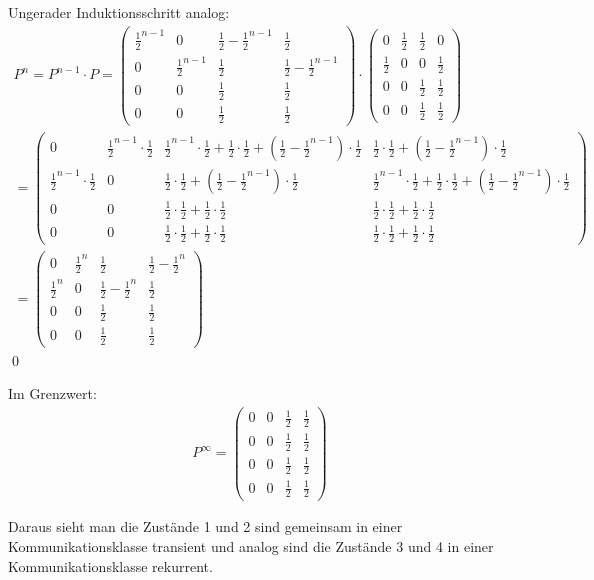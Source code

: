 \documentclass[a4paper,11pt,notitlepage,fullpage]{article}
\begin{document}
\begin{enumerate}
\begin{enumerate}
Ungerader Induktionsschritt analog:
\begin{gather*}
P^n = P^{n-1} \cdot P = \begin{pmatrix}
\frac{1}{2}^{n-1}&0&\frac{1}{2}-\frac{1}{2}^{n-1}&\frac{1}{2} \\
0&\frac{1}{2}^{n-1}&\frac{1}{2}&\frac{1}{2}-\frac{1}{2}^{n-1} \\
0&0&\frac{1}{2}&\frac{1}{2}\\
0&0&\frac{1}{2}&\frac{1}{2}
\end{pmatrix} \cdot \begin{pmatrix}
0&\frac{1}{2}&\frac{1}{2}&0 \\
\frac{1}{2}&0&0&\frac{1}{2} \\
0&0&\frac{1}{2}&\frac{1}{2}\\
0&0&\frac{1}{2}&\frac{1}{2}
\end{pmatrix} \\
= \begin{pmatrix}
0 & \frac{1}{2}^{n-1} \cdot \frac{1}{2} & \frac{1}{2}^{n-1} \cdot \frac{1}{2} + \frac{1}{2}\cdot\frac{1}{2} +  (\frac{1}{2} - \frac{1}{2}^{n-1})\cdot\frac{1}{2} & \frac{1}{2}\cdot\frac{1}{2} + (\frac{1}{2} - \frac{1}{2}^{n-1})\cdot\frac{1}{2} \\
\frac{1}{2}^{n-1} \cdot \frac{1}{2} & 0 & \frac{1}{2}\cdot\frac{1}{2} + (\frac{1}{2} - \frac{1}{2}^{n-1})\cdot\frac{1}{2} & \frac{1}{2}^{n-1} \cdot \frac{1}{2} + \frac{1}{2}\cdot\frac{1}{2} +  (\frac{1}{2} - \frac{1}{2}^{n-1})\cdot\frac{1}{2}\\
0&0&\frac{1}{2}\cdot\frac{1}{2} + \frac{1}{2}\cdot\frac{1}{2}&\frac{1}{2}\cdot\frac{1}{2} + \frac{1}{2}\cdot\frac{1}{2}\\
0&0&\frac{1}{2}\cdot\frac{1}{2} + \frac{1}{2}\cdot\frac{1}{2}&\frac{1}{2}\cdot\frac{1}{2} + \frac{1}{2}\cdot\frac{1}{2}
\end{pmatrix} \\
= \begin{pmatrix}
0&\frac{1}{2}^n&\frac{1}{2}&\frac{1}{2}-\frac{1}{2}^n \\
\frac{1}{2}^n&0&\frac{1}{2}-\frac{1}{2}^n&\frac{1}{2} \\
0&0&\frac{1}{2}&\frac{1}{2}\\
0&0&\frac{1}{2}&\frac{1}{2}
\end{pmatrix}
\end{gather*}
\qed

Im Grenzwert:
\begin{align*}
P^\infty = \begin{pmatrix}
0&0&\frac{1}{2}&\frac{1}{2}\\
0&0&\frac{1}{2}&\frac{1}{2}\\
0&0&\frac{1}{2}&\frac{1}{2}\\
0&0&\frac{1}{2}&\frac{1}{2}
\end{pmatrix}
\end{align*}

Daraus sieht man die Zustände 1 und 2 sind gemeinsam in einer Kommunikationsklasse transient und analog sind die Zustände 3 und 4 in einer Kommunikationsklasse rekurrent.
\end{enumerate}

\end{enumerate}
\end{document}
